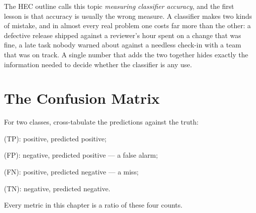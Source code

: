 The HEC outline calls this topic \emph{measuring classifier accuracy}, and the
first lesson is that accuracy is usually the wrong measure. A classifier makes
two kinds of mistake, and in almost every real problem one costs far more than
the other: a defective release shipped against a reviewer's hour spent on a
change that was fine, a late task nobody warned about against a needless check-in
with a team that was on track. A single number that adds the
two together hides exactly the information needed to decide whether the
classifier is any use.

\section{The Confusion Matrix}

\begin{definitionbox}
For two classes, cross-tabulate the predictions against the truth:
\begin{tight}
  \item {} (TP): positive, predicted positive;
  \item {} (FP): negative, predicted positive --- a false alarm;
  \item {} (FN): positive, predicted negative --- a miss;
  \item {} (TN): negative, predicted negative.
\end{tight}
Every metric in this chapter is a ratio of these four counts.
\end{definitionbox}

